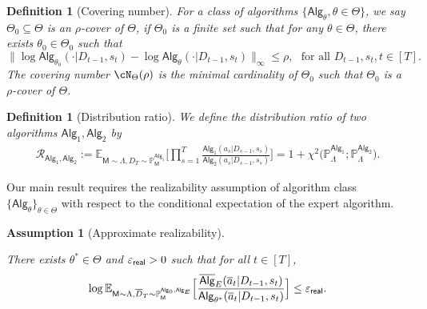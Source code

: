 \documentclass[10pt]{article}
\newtheorem{definition}[theorem]{Definition}
\newtheorem{assumption}{Assumption}
\renewcommand{\epsilon}{\varepsilon}
\newcommand{\<}{\left\langle}
\renewcommand{\>}{\right\rangle}
\newcommand{\E}{\mathbb{E}}
\renewcommand{\P}{\mathbb{P}}
\newcommand{\inst}{{\mathsf{M}}}
\newcommand{\widebar}[1]{\overline{#1}}
\newcommand{\state}{{s}}
\newcommand{\action}{{a}}
\newcommand{\eaction}{{\widebar{a}}}
\newcommand{\totlen}{{T}}
\newcommand{\sAlg}{{\mathsf{Alg}}}
\newcommand{\osAlg}{\overline{\mathsf{Alg}}}
\newcommand{\dset}{{D}}
\newcommand{\adset}{{\widebar{D}}}
\newcommand{\Par}{{\theta}}
\newcommand{\Parspace}{{\Theta}}
\newcommand{\TruePar}{{\theta^*}}
\newcommand{\prior}{{\Lambda}}
\newcommand{\shortexp}{{E}}
\newcommand{\geneps}{{\epsilon}_{\sf real}}
\newcommand{\distratio}{{\mathcal{R}}}
\begin{document}
\begin{definition}[Covering number]\label{def:cover_number_general} For a class of algorithms $\{\sAlg_\Par,\Par\in\Parspace\}$,
we say $\Parspace_0 \subseteq\Parspace$ is an  $\rho$-cover of $\Parspace$, if $\Parspace_0$ is a finite set such that for any $\Par\in\Parspace$, there exists $\Par_0\in\Parspace_0$ such that
\[
\|\log \sAlg_{\Par_0}(\cdot|\dset_{t-1},\state_t)-\log \sAlg_{\Par}(\cdot|\dset_{t-1},\state_t)\|_{\infty}\leq\rho,~~~ \text{for all } \dset_{t-1},\state_t, t\in[\totlen].
\]
The covering number $\cN_{\Parspace}(\rho)$ is the minimal cardinality of $\Parspace_0$ such that $\Parspace_0$ is a $\rho$-cover of $\Parspace$.
\end{definition}
















\begin{definition}[Distribution ratio]\label{def:dist_ratio}
\label{def:distribution-ratio}
We define the distribution ratio of two algorithms $\sAlg_1,\sAlg_2$ by
\begin{align*}\distratio_{\sAlg_1,\sAlg_2}
:=
\E_{\inst\sim\prior,\dset_\totlen\sim\P_\inst^{\sAlg_1}}
\Big[\prod_{s=1}^{\totlen}\frac{\sAlg_1(\action_s|\dset_{s-1},\state_s)}{\sAlg_2(\action_s|\dset_{s-1},\state_s)}\Big] = 1 + \chi^2\Big( \P_\prior^{\sAlg_1};\P_\prior^{\sAlg_2} \Big).
\end{align*}
\end{definition}



Our main result requires the realizability assumption of algorithm class $\{ \sAlg_\Par\}_{\Par \in \Parspace}$ with respect to the conditional expectation of the expert algorithm.

\begin{assumption}[Approximate realizability]
\label{asp:realizability}

There exists $\TruePar\in\Parspace$ and $\geneps > 0$ such that for all $t\in[\totlen]$,
\begin{align}
\label{eqn:plc_approx_general}
\log\E_{\inst \sim \prior, \adset_\totlen \sim \P_{\inst}^{\sAlg_0,\sAlg_\shortexp}}\Big[\frac{\osAlg_{\shortexp}(\eaction_t|\dset_{t-1},\state_t )}{\sAlg_\TruePar(\eaction_t|\dset_{t-1},\state_t )}\Big] \le \geneps.
\end{align}

\end{assumption}
\end{document}
